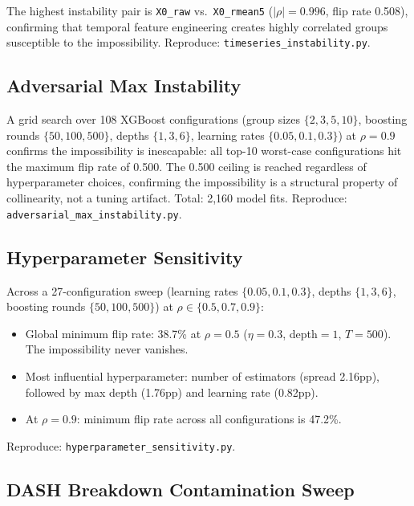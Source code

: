 \documentclass{article}
\begin{document}
The highest instability pair is \texttt{X0\_raw} vs.\ \texttt{X0\_rmean5} ($|\rho|{=}0.996$, flip rate 0.508), confirming that temporal feature engineering creates highly correlated groups susceptible to the impossibility.
Reproduce: \texttt{timeseries\_instability.py}.

\subsection{Adversarial Max Instability}
\label{sec:adversarial}

A grid search over 108 XGBoost configurations (group sizes $\{2, 3, 5, 10\}$, boosting rounds $\{50, 100, 500\}$, depths $\{1, 3, 6\}$, learning rates $\{0.05, 0.1, 0.3\}$) at $\rho{=}0.9$ confirms the impossibility is inescapable: all top-10 worst-case configurations hit the maximum flip rate of 0.500. The 0.500 ceiling is reached regardless of hyperparameter choices, confirming the impossibility is a structural property of collinearity, not a tuning artifact. Total: 2,160 model fits.
Reproduce: \texttt{adversarial\_max\_instability.py}.

\subsection{Hyperparameter Sensitivity}
\label{sec:hyperparameter-sensitivity}

Across a 27-configuration sweep (learning rates $\{0.05, 0.1, 0.3\}$, depths $\{1, 3, 6\}$, boosting rounds $\{50, 100, 500\}$) at $\rho \in \{0.5, 0.7, 0.9\}$:

\begin{itemize}
\item Global minimum flip rate: 38.7\% at $\rho{=}0.5$ ($\eta{=}0.3$, depth${=}1$, $T{=}500$). The impossibility never vanishes.
\item Most influential hyperparameter: number of estimators (spread 2.16pp), followed by max depth (1.76pp) and learning rate (0.82pp).
\item At $\rho{=}0.9$: minimum flip rate across all configurations is 47.2\%.
\end{itemize}

Reproduce: \texttt{hyperparameter\_sensitivity.py}.

\subsection{DASH Breakdown Contamination Sweep}
\label{sec:dash-contamination}
\end{document}
